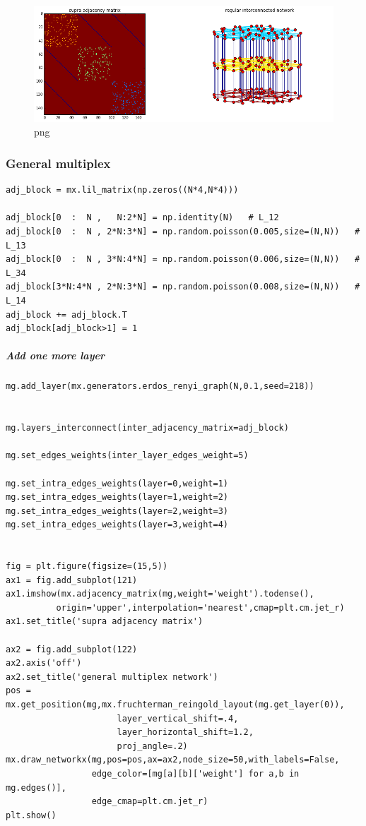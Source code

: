 \documentclass[]{article}
\begin{document}
\begin{figure}[htbp]
\centering
\includegraphics{output_51_0.png}
\caption{png}
\end{figure}

\subsubsection{General multiplex}\label{general-multiplex}

\begin{verbatim}
adj_block = mx.lil_matrix(np.zeros((N*4,N*4)))

adj_block[0  :  N ,   N:2*N] = np.identity(N)   # L_12
adj_block[0  :  N , 2*N:3*N] = np.random.poisson(0.005,size=(N,N))   # L_13
adj_block[0  :  N , 3*N:4*N] = np.random.poisson(0.006,size=(N,N))   # L_34
adj_block[3*N:4*N , 2*N:3*N] = np.random.poisson(0.008,size=(N,N))   # L_14
adj_block += adj_block.T
adj_block[adj_block>1] = 1
\end{verbatim}

\subparagraph{Add one more layer}\label{add-one-more-layer}

\begin{verbatim}
mg.add_layer(mx.generators.erdos_renyi_graph(N,0.1,seed=218))


mg.layers_interconnect(inter_adjacency_matrix=adj_block)

mg.set_edges_weights(inter_layer_edges_weight=5)

mg.set_intra_edges_weights(layer=0,weight=1)
mg.set_intra_edges_weights(layer=1,weight=2)
mg.set_intra_edges_weights(layer=2,weight=3)
mg.set_intra_edges_weights(layer=3,weight=4)


fig = plt.figure(figsize=(15,5))
ax1 = fig.add_subplot(121)
ax1.imshow(mx.adjacency_matrix(mg,weight='weight').todense(),
          origin='upper',interpolation='nearest',cmap=plt.cm.jet_r)
ax1.set_title('supra adjacency matrix')

ax2 = fig.add_subplot(122)
ax2.axis('off')
ax2.set_title('general multiplex network')
pos = mx.get_position(mg,mx.fruchterman_reingold_layout(mg.get_layer(0)),
                      layer_vertical_shift=.4,
                      layer_horizontal_shift=1.2,
                      proj_angle=.2)
mx.draw_networkx(mg,pos=pos,ax=ax2,node_size=50,with_labels=False,
                 edge_color=[mg[a][b]['weight'] for a,b in mg.edges()],
                 edge_cmap=plt.cm.jet_r)
plt.show()
\end{verbatim}
\end{document}
